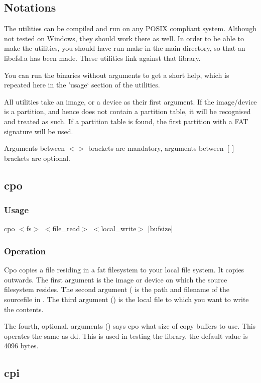 \subsection{Notations}
The utilities can be compiled and run on any POSIX compliant system.
Although not tested on Windows, they should work there as well. In order
to be able to make the utilities, you should have run make in the main directory,
so that an libefsl.a has been made. These utilities link against that library.

You can run the binaries without arguments to get a short help, which is repeated
here in the 'usage` section of the utilities.

All utilities take an image, or a device as their first argument. If the image/device
is a partition, and hence does not contain a partition table, it will be recognised and treated
as such.
If a partition table is found, the first partition with a FAT signature will be used. 

Arguments between $<>$ brackets are mandatory, arguments between $[]$ brackets are optional.


\subsection{cpo}
    \subsubsection*{Usage}
	cpo $<$fs$>$ $<$file\_read$>$ $<$local\_write$>$ [bufsize]
    \subsubsection*{Operation}
	Cpo copies a file residing in a fat filesystem to your local file system. It copies
	outwards. The first argument  is the image or device on which the source
	filesystem resides. The second argument ( is the path and filename
	of the sourcefile in . The third argument () is the
	local file to which you want to write the contents.
	
	The fourth, optional, arguments () says cpo what size of copy buffers
	to use. This operates the same as dd. This is used in testing the library, the
	default value is 4096 bytes.
    
\subsection{cpi}
